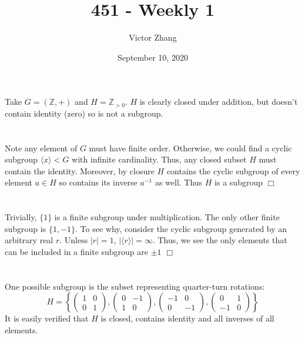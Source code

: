 \documentclass{article}
\title{451 - Weekly 1}
\author{Victor Zhang}
\date{September 10, 2020}
\begin{document}
\maketitle

\section{}
Take $G = (\mathbb{Z}, +)$ and $H = \mathbb{Z}_{>0}$. $H$ is clearly closed under addition, but doesn't contain identity (zero) so is not a subgroup.

\section{}
Note any element of $G$ must have finite order. Otherwise, we could find a cyclic subgroup $\langle x \rangle < G$ with infinite cardinality. Thus, any closed subset $H$ must contain the identity. Moreover, by closure $H$ contains the cyclic subgroup of every element $a \in H$ so contains its inverse $a^{-1}$ as well. Thus $H$ is a subgroup $\Box$

\section{}
Trivially, $\{1\}$ is a finite subgroup under multiplication. The only other finite subgroup is $\{1,-1\}$. To see why, consider the cyclic subgroup generated by an arbitrary real $r$. Unless $|r| = 1$, $|\langle r \rangle| = \infty$. Thus, we see the only elements that can be included in a finite subgroup are $\pm 1$ $\Box$

\section{}
One possible subgroup is the subset representing quarter-turn rotations:
$$H = \left\{\left( \begin{matrix} 1 & 0 \\ 0 & 1 \end{matrix} \right), \left( \begin{matrix} 0 & -1 \\ 1 & 0 \end{matrix} \right), \left( \begin{matrix} -1 & 0 \\ 0 & -1 \end{matrix} \right), \left( \begin{matrix} 0 & 1 \\ -1 & 0 \end{matrix} \right)\right\}$$
It is easily verified that $H$ is closed, contains identity and all inverses of all elements.
\end{document}
